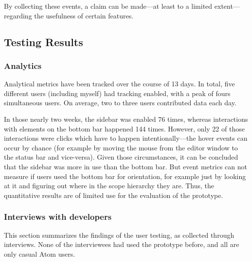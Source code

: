 By collecting these events, a claim can be made—at least to a limited
extent—regarding the usefulness of certain features.

\subsection{Testing Results}\label{testing-results}

\subsubsection{Analytics}\label{analytics}

Analytical metrics have been tracked over the course of 13 days. In
total, five different users (including myself) had tracking enabled,
with a peak of fours simultaneous users. On average, two to three users
contributed data each day.

In those nearly two weeks, the sidebar was enabled 76 times, whereas
interactions with elements on the bottom bar happened 144 times.
However, only 22 of those interactions were clicks which have to happen
intentionally—the hover events can occur by chance (for example by
moving the mouse from the editor window to the status bar and
vice-versa). Given those circumstances, it can be concluded that the
sidebar was more in use than the bottom bar. But event metrics can not
measure if users used the bottom bar for orientation, for example just
by looking at it and figuring out where in the scope hierarchy they are.
Thus, the quantitative results are of limited use for the evaluation of
the prototype.

\subsubsection{Interviews with
developers}\label{interviews-with-developers}

This section summarizes the findings of the user testing, as collected
through interviews. None of the interviewees had used the prototype
before, and all are only casual Atom users.

